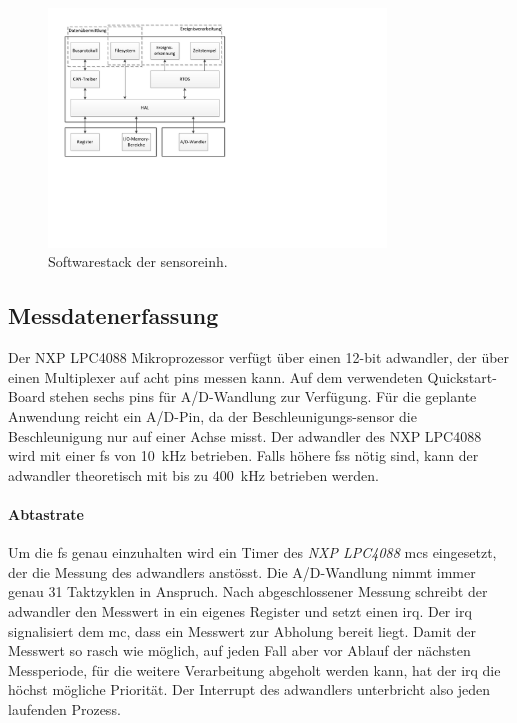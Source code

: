 \begin{figure}
	\centering
		\includegraphics[width=0.8\textwidth]{images/visio/Softwarestack_Sensor.pdf}
	\caption{Softwarestack der \gls{sensoreinh}.}
	\label{fig.sw_sensor}
\end{figure}



\subsection{Messdatenerfassung}\label{subsec.sw_messen}
Der NXP LPC4088 Mikroprozessor verfügt über einen 12-bit \gls{adwandler}, der über einen Multiplexer auf acht \glspl{pin} messen kann. Auf dem verwendeten Quickstart-Board stehen sechs \glspl{pin} für A/D-Wandlung zur Verfügung. Für die geplante Anwendung reicht ein A/D-Pin, da der Beschleunigungs-\gls{sensor} die Beschleunigung nur auf einer Achse misst. Der \gls{adwandler} des NXP LPC4088 wird mit einer \gls{fs} von 10~kHz betrieben. Falls höhere \glspl{fs} nötig sind, kann der \gls{adwandler} theoretisch mit bis zu 400~kHz betrieben werden.

\paragraph{Abtastrate} Um die \gls{fs} genau einzuhalten wird ein Timer des \emph{NXP LPC4088} \gls{mc}s eingesetzt, der die Messung des \gls{adwandler}s anstösst. Die A/D-Wandlung nimmt immer genau 31 Taktzyklen in Anspruch. Nach abgeschlossener Messung schreibt der \gls{adwandler} den Messwert in ein eigenes Register und setzt einen \gls{irq}. Der \gls{irq} signalisiert dem \gls{mc}, dass ein Messwert zur Abholung bereit liegt. Damit der Messwert so rasch wie möglich, auf jeden Fall aber vor Ablauf der nächsten Messperiode, für die weitere Verarbeitung abgeholt werden kann, hat der \gls{irq} die höchst mögliche Priorität. Der Interrupt des \gls{adwandler}s unterbricht also jeden laufenden Prozess.

